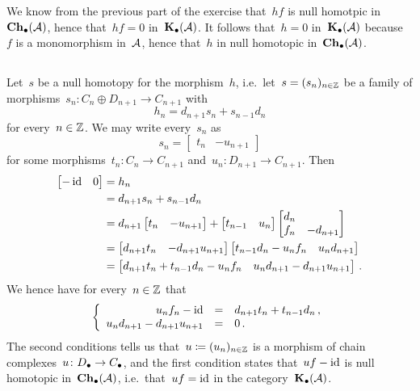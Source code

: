 We know from the previous part of the exercise that~$hf$ is null homotpic in~$\mathbf{Ch}_\bullet(\mathcal{A})$, hence that~$hf = 0$ in~$\mathbf{K}_\bullet(\mathcal{A})$.
It follows that~$h = 0$ in~$\mathbf{K}_\bullet(\mathcal{A})$ because~$f$ is a monomorphism in~$\mathcal{A}$, hence that~$h$ in null homotopic in~$\mathbf{Ch}_\bullet(\mathcal{A})$.





\subsection{}

Let~$s$ be a null homotopy for the morphism~$h$, i.e.\ let~$s = (s_n)_{n \in \mathbb{Z}}$  be a family of morphisms~$s_n \colon C_n \oplus D_{n+1} \to C_{n+1}$ with
\[
    h_n
  = d_{n+1} s_n + s_{n-1} d_n
\]
for every~$n \in \mathbb{Z}$.
We may write every~$s_n$ as
\[
    s_n
  = \begin{bmatrix}
      t_n & -u_{n+1}
    \end{bmatrix}
\]
for some morphisms~$t_n \colon C_n \to C_{n+1}$ and~$u_n \colon D_{n+1} \to C_{n+1}$.
Then
\begin{align*}
      \begin{bmatrix}
        -\operatorname{id}  & 0
      \end{bmatrix}
  &=  h_n \\
  &=  d_{n+1} s_n + s_{n-1} d_n \\
  &=  d_{n+1}
      \begin{bmatrix}
        t_n & -u_{n+1}
      \end{bmatrix}
      +
      \begin{bmatrix}
        t_{n-1} & u_n
      \end{bmatrix}
      \begin{bmatrix}
        d_n &           \\
        f_n & -d_{n+1}
      \end{bmatrix} \\
  &=  \begin{bmatrix}
        d_{n+1} t_n & -d_{n+1} u_{n+1}
      \end{bmatrix}
      \begin{bmatrix}
        t_{n-1} d_n - u_n f_n & u_n d_{n+1}
      \end{bmatrix} \\
  &=  \begin{bmatrix}
        d_{n+1} t_n + t_{n-1} d_n - u_n f_n & u_n d_{n+1} - d_{n+1} u_{n+1}
      \end{bmatrix} \,.
\end{align*}
We hence have for every~$n \in \mathbb{Z}$ that
\[
  \left\{
    \begin{array}{rcl}
        u_n f_n - \operatorname{id}                 &=& d_{n+1} t_n + t_{n-1} d_n \,, \\
        u_n d_{n+1} - d_{n+1} u_{n+1} &=& 0 \,.
    \end{array}
  \right.
\]
The second conditions tells us that~$u \coloneqq (u_n)_{n \in \mathbb{Z}}$ is a morphism of chain complexes~$u \colon D_\bullet \to C_\bullet$, and the first condition states that~$uf - \operatorname{id}$ is null homotopic in~$\mathbf{Ch}_\bullet(\mathcal{A})$, i.e.\ that~$uf = \operatorname{id}$ in the category~$\mathbf{K}_\bullet(\mathcal{A})$.





